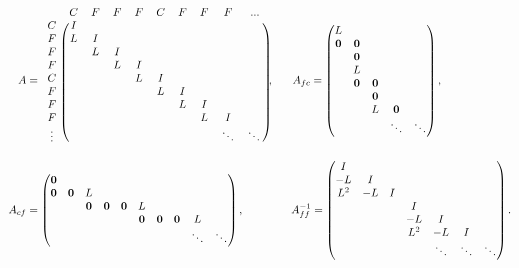 \documentclass[a4paper,12pt]{article}
\begin{document}
%
{\footnotesize
\begin{align*}
A & = \begin{blockarray}{ccccccccccc}
& C & F & F & F & C & F & F & F & ... \\
\begin{block}{c(cccccccccc)}
C &  I & & & & & \\
F &  L & I & & & & \\
F &  & L & I & & & \\
F &  & & L & I & & \\
C &  & & & L & I &  \\
F &  &  & & & L & I  \\ 
F & & &  & & & L & I  \\ 
F & & & & & & & L & I  \\ 
\vdots  & & &&& & & & \ddots & \ddots \\
\end{block}
\end{blockarray}, 
\hspace{4ex}
A_{fc} =  \begin{pmatrix} L \\ \mathbf{0} & \mathbf{0}  \\ & \mathbf{0}  \\ & L \\ & \mathbf{0} & \mathbf{0} \\ & & \mathbf{0} \\
	& & L & \mathbf{0} \\ &&&\ddots&\ddots \end{pmatrix}, 
\\
A_{cf} & = \begin{pmatrix} \mathbf{0} \\ \mathbf{0} & \mathbf{0} & L \\ && \mathbf{0} & \mathbf{0} & \mathbf{0} & L \\
	&& &&& \mathbf{0} & \mathbf{0} & \mathbf{0} & L \\ &&&&&&&&\ddots&\ddots \end{pmatrix}, 
\hspace{10ex}
A_{ff}^{-1} = \begin{pmatrix} I \\ -L & I \\ L^2 & -L & I \\ & & & I \\ & & & -L & I \\ & & & L^2 & -L & I\\ & & & & \ddots & \ddots & \ddots \end{pmatrix}.
\end{align*}
}
\end{document}
